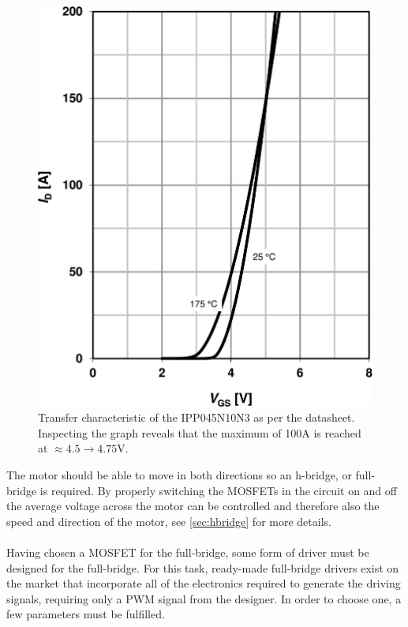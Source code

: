\begin{figure}[H]
	\centering
	\includegraphics[width=.5\linewidth]{graphics/mosfet_transfer_characteristic}
	\caption{Transfer characteristic of the IPP045N10N3 as per the datasheet.
	Inspecting the graph reveals that the maximum \id of 100A is reached at \vgs$\approx4.5\rightarrow4.75$V.}
	\label{fig:mosfettransfercharacteristic}
\end{figure}

The motor should be able to move in both directions so an h-bridge, or full-bridge is required.
By properly switching the MOSFETs in the circuit on and off the average voltage across the motor can be controlled and therefore also the speed and direction of the motor, see \ref{sec:hbridge} for more details.
\\~\\
Having chosen a MOSFET for the full-bridge, some form of driver must be designed for the full-bridge.
For this task, ready-made full-bridge drivers exist on the market that incorporate all of the electronics required to generate the driving signals, requiring only a PWM signal from the designer.
In order to choose one, a few parameters must be fulfilled.

